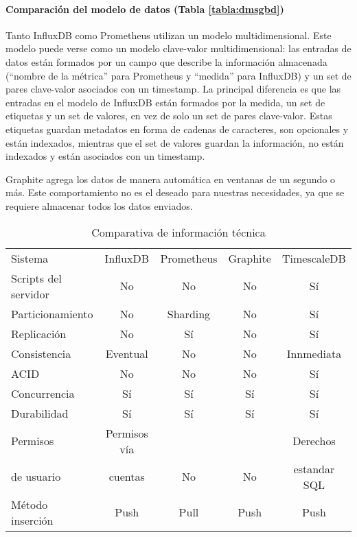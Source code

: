\paragraph*{Comparación del modelo de datos (Tabla \ref*{tabla:dmsgbd})} Tanto InfluxDB como Prometheus utilizan un modelo 
multidimensional. Este modelo puede verse como un modelo clave-valor multidimensional: las entradas de datos están formados 
por un campo que describe la información almacenada (``nombre de la métrica'' para Prometheus y ``medida'' para InfluxDB) 
y un set de pares clave-valor asociados con un timestamp. La principal diferencia es que las entradas en el modelo de InfluxDB 
están formados por la medida, un set de etiquetas y un set de valores, en vez de solo un set de pares clave-valor. 
Estas etiquetas guardan metadatos en forma de cadenas de caracteres, son opcionales y están indexados, mientras que el set de 
valores guardan la información, no están indexados y están asociados con un timestamp.

Graphite agrega los datos de manera automática en ventanas de un segundo o más. Este comportamiento no es el deseado 
para nuestras necesidades, ya que se requiere almacenar todos los datos enviados.

\begin{table}[H]
    \begin{center}
        \begin{adjustbox}{max width=\textwidth}
            \begin{tabular}{l c c c c}
                \toprule
                Sistema & InfluxDB & Prometheus & Graphite & TimescaleDB \\
                \otoprule
                Scripts del servidor & No & No & No & Sí \\
                \rowcolor{gray!35}
                Particionamiento & No & Sharding & No & Sí \\
                Replicación & No & Sí & No & Sí \\
                \rowcolor{gray!35}
                Consistencia & Eventual & No & No & Innmediata \\
                ACID& No & No & No & Sí \\
                \rowcolor{gray!35}
                Concurrencia & Sí & Sí & Sí & Sí \\
                Durabilidad & Sí & Sí & Sí & Sí \\
                \rowcolor{gray!35}
                Permisos                   & Permisos vía    &                      &                      & Derechos \\
                \rowcolor{gray!35}
                de usuario & cuentas & \multirow{-2}{*}{No} & \multirow{-2}{*}{No} & estandar SQL \\
                Método inserción & Push & Pull & Push & Push \\
                \bottomrule
            \end{tabular}
        \end{adjustbox}
        \caption{Comparativa de información técnica}
        \label{tabla:tisgbd}
    \end{center}
\end{table}

